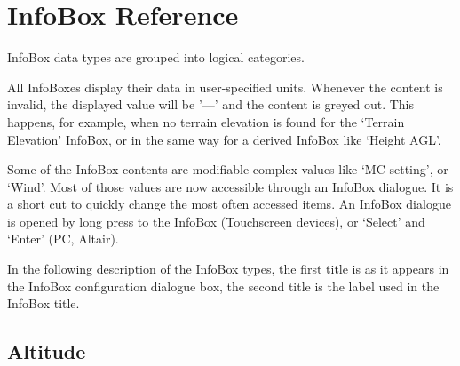 \chapter{InfoBox Reference}\label{cha:infobox}
InfoBox data types are grouped into logical categories.

All InfoBoxes display their data in user-specified units.  Whenever the content 
is invalid, the displayed value will be '---' and the content is
greyed out.  This happens, for example, when no terrain elevation is found for 
the `Terrain Elevation' InfoBox, or in the same way for a derived InfoBox like 
`Height AGL'.

Some of the InfoBox contents are modifiable complex values like `MC setting', or `Wind'. Most of 
those values are now accessible through an InfoBox dialogue. It is a short cut to quickly 
change the most often accessed items. An InfoBox dialogue is opened by long press to the InfoBox 
(Touchscreen devices), or `Select' and `Enter' (PC, Altair).

In the following description of the InfoBox types, the first
title is as it appears in the InfoBox configuration dialogue box, the
second title is the label used in the InfoBox title.

\newcommand{\ibi}[3]{%
\jindent{
\begin{tabular}{r}
{\bf #1} \\
\infobox{{#2}} \\
\end{tabular}}{#3}
}
\newcommand{\ibig}[4]{%
\jindent{
\begin{tabular}{r}
{\bf #1} \\
\infobox{{#2}} \\
\texttt{[image: \#4]} \\
\end{tabular}}{#3}
}


\section{Altitude}

